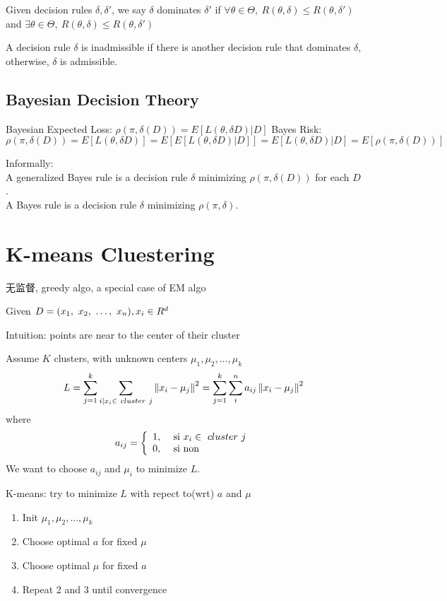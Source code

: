 \documentclass{article}
\begin{document}
\begin{definition}
Given decision rules $\delta, \delta'$, we say $\delta$ dominates $\delta'$ 
if $\forall \theta \in \Theta,\ R(\theta, \delta) \leq R(\theta, \delta')$
and $\exists \theta \in \Theta,\ R(\theta, \delta) \le R(\theta, \delta')$
\end{definition}

\begin{definition}
A decision rule $\delta$ is inadmissible if there is another decision rule that dominates $\delta$, otherwise, $\delta$ is admissible.
\end{definition}

\subsection{Bayesian Decision Theory}
Bayesian Expected Loss: $\rho(\pi, \delta(D)) = E[L(\theta, \delta{D}) | D]$
Bayes Risk: $\rho(\pi, \delta(D)) = E[L(\theta, \delta{D})] = E[E[L(\theta, \delta{D}) | D]] = E[L(\theta, \delta{D})|D] = E[\rho(\pi, \delta(D))]$

Informally:\\
A generalized Bayes rule is a decision rule $\delta$ minimizing $\rho(\pi, \delta(D))$ for each $D$.\\
A Bayes rule is a decision rule $\delta$ minimizing $\rho(\pi, \delta)$.

\section{K-means Cluestering}
无监督, greedy algo, a special case of EM algo

Given $D = (x_1,~x_2,~\ldots,~x_n), x_i \in R^d$

Intuition: points are near to the center of their cluster

Assume $K$ clusters, with unknown centers $\mu_1, \mu_2, \ldots, \mu_k$
$$
L
= \sum_{j = 1}^k \sum_{i | x_i \in\ cluster\ j}\left\Vert x_i - \mu_j\right\Vert^2
= \sum_{j = 1}^k \sum_i^n a_{ij}\left\Vert x_i - \mu_j\right\Vert^2
$$
where
$$
a_{ij} =
\left\{
  \begin{array}{ll}
    1, & \textrm{\ si } x_i \in\ cluster\ j\\
    0, & \textrm{ si non}
  \end{array}
\right.
$$
We want to choose $a_{ij}$ and $\mu_i$ to minimize $L$.

K-means: try to minimize $L$ with repect to(wrt) $a$ and $\mu$
\begin{enumerate}
\item Init $\mu_1, \mu_2, \ldots, \mu_k$
\item Choose optimal $a$ for fixed $\mu$
\item Choose optimal $\mu$ for fixed $a$
\item Repeat 2 and 3 until convergence
\end{enumerate}
\end{document}
